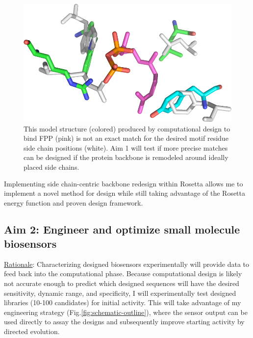 \newcommand{\matchingmotifcaption}{
  This model structure (colored) produced by computational design to bind FPP (pink) is not an exact match for the desired motif residue side chain positions (white).
  Aim 1 will test if more precise matches can be designed if the protein backbone is remodeled around ideally placed side chains.
}

\begin{figure}[H]
  \centering
  \includegraphics[width=\textwidth,keepaspectratio]{figures/biosensor-fig-2.png}
  \caption[Example of current matcher performance]{
    This model structure (colored) produced by computational design to bind FPP (pink) is not an exact match for the desired motif residue side chain positions (white).
    Aim 1 will test if more precise matches can be designed if the protein backbone is remodeled around ideally placed side chains.
  }
  \label{fig:matching-motif}
\end{figure}

Implementing side chain-centric backbone redesign within Rosetta allows me to implement a novel method for design while still taking advantage of the Rosetta energy function and proven design framework\cite{jiang_novo_2008}\cite{khersonsky_optimization_2011}.

\subsection{Aim 2: Engineer and optimize small molecule biosensors}

\noindent
\underline{Rationale}: Characterizing designed biosensors experimentally will provide data to feed back into the computational phase.
Because computational design is likely not accurate enough to predict which designed sequences will have the desired sensitivity, dynamic range, and specificity, I will experimentally test designed libraries (10-100 candidates) for initial activity.
This will take advantage of my engineering strategy (Fig.\ref{fig:schematic-outline}), where the sensor output can be used directly to assay the designs and subsequently improve starting activity by directed evolution.

